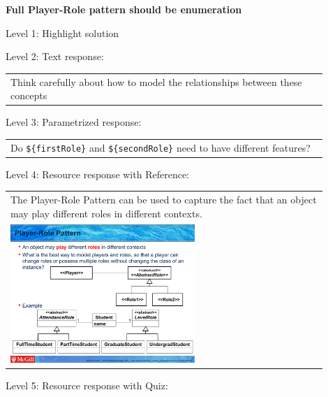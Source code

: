 \noindent \textbf{Full Player-Role pattern should be enumeration} \medskip

\noindent Level 1: Highlight solution \medskip

\noindent Level 2: Text response: \medskip

\begin{tabular}{|p{0.9\linewidth}}
Think carefully about how to model the relationships between these concepts
\end{tabular} \medskip

\noindent Level 3: Parametrized response: \medskip

\begin{tabular}{|p{0.9\linewidth}}
Do \verb|${firstRole}| and \verb|${secondRole}| need to have different features?
\end{tabular} \medskip

\noindent Level 4: Resource response with Reference: \medskip

\begin{tabular}{|p{0.9\linewidth}}
The Player-Role Pattern can be used to capture the fact that an object may play different roles
in different contexts.

\\
\includegraphics[width=0.6\textwidth]{images/player_role.png}
\end{tabular} \medskip

\noindent Level 5: Resource response with Quiz: \medskip


